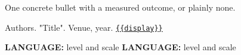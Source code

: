 \documentclass[11pt]{article}
\begin{document}
\begin{cvitems}
  \item {{One concrete bullet with a measured outcome, or plainly none.}}
\end{cvitems}
\vspace{5pt}

{{Authors. "Title". Venue, year.}} \href{{{URL}}}{\nolinkurl{{{display}}}}

\textbf{{{LANGUAGE}}:} {{level and scale}}\cvdot
\textbf{{{LANGUAGE}}:} {{level and scale}}
\end{document}
